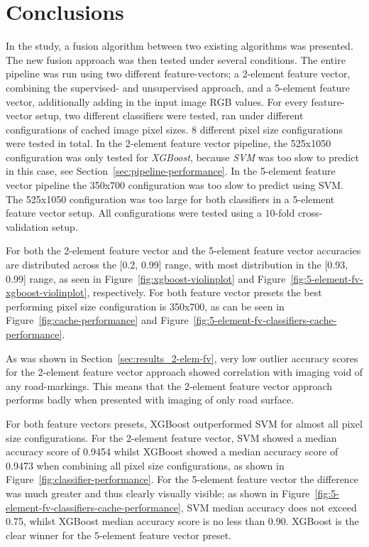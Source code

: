 
\section{Conclusions}\label{sec:conclusions}
In the study, a fusion algorithm between two existing algorithms was presented. The new fusion approach was then tested under several conditions. The entire pipeline was run using two different feature-vectors; a 2-element feature vector, combining the supervised- and unsupervised approach, and a 5-element feature vector, additionally adding in the input image RGB values. For every feature-vector setup, two different classifiers were tested, ran under different configurations of cached image pixel sizes. 8 different pixel size configurations were tested in total. In the 2-element feature vector pipeline, the 525x1050 configuration was only tested for \textit{XGBoost}, because \textit{SVM} was too slow to predict in this case, see Section~\ref{sec:pipeline-performance}. In the 5-element feature vector pipeline the 350x700 configuration was too slow to predict using SVM. The 525x1050 configuration was too large for both classifiers in a 5-element feature vector setup. All configurations were tested using a $10$-fold cross-validation setup.

For both the 2-element feature vector and the 5-element feature vector accuracies are distributed across the [0.2, 0.99] range, with most distribution in the [0.93, 0.99] range, as seen in Figure~\ref{fig:xgboost-violinplot} and Figure~\ref{fig:5-element-fv-xgboost-violinplot}, respectively. For both feature vector presets the best performing pixel size configuration is 350x700, as can be seen in Figure~\ref{fig:cache-performance} and Figure~\ref{fig:5-element-fv-classifiers-cache-performance}.

As was shown in Section~\ref{sec:results_2-elem-fv}, very low outlier accuracy scores for the 2-element feature vector approach showed correlation with imaging void of any road-markings. This means that the 2-element feature vector approach performs badly when presented with imaging of only road surface.

For both feature vectors presets, XGBoost outperformed SVM for almost all pixel size configurations. For the 2-element feature vector, SVM showed a median accuracy score of 0.9454 whilst XGBoost showed a median accuracy score of 0.9473 when combining all pixel size configurations, as shown in Figure~\ref{fig:classifier-performance}. For the 5-element feature vector the difference was much greater and thus clearly visually visible; as shown in Figure~\ref{fig:5-element-fv-classifiers-cache-performance}, SVM median accuracy does not exceed 0.75, whilst XGBoost median accuracy score is no less than 0.90. XGBoost is the clear winner for the 5-element feature vector preset.

